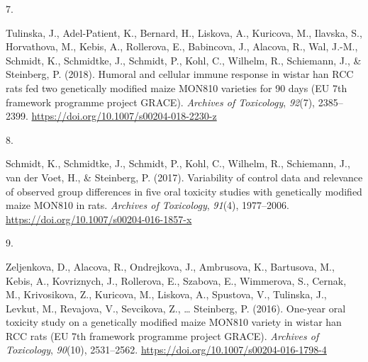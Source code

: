 \documentclass[11pt, a4paper]{awesome-cv}
\newlength{\csllabelwidth}
\newcommand{\CSLLeftMargin}[1]{\parbox[t]{\csllabelwidth}{#1}}
\newcommand{\CSLRightInline}[1]{\parbox[t]{\linewidth - \csllabelwidth}{#1}}
\begin{document}
\leavevmode\hypertarget{ref-Tulinska2018}{}%
\CSLLeftMargin{7. }
\CSLRightInline{Tulinska, J., Adel-Patient, K., Bernard, H., Liskova,
A., Kuricova, M., Ilavska, S., Horvathova, M., Kebis, A., Rollerova, E.,
Babincova, J., Alacova, R., Wal, J.-M., Schmidt, K., Schmidtke, J.,
Schmidt, P., Kohl, C., Wilhelm, R., Schiemann, J., \& Steinberg, P.
(2018). Humoral and cellular immune response in wistar han RCC rats fed
two genetically modified maize MON810 varieties for 90 days (EU 7th
framework programme project GRACE). \emph{Archives of Toxicology},
\emph{92}(7), 2385--2399.
\url{https://doi.org/10.1007/s00204-018-2230-z}}

\leavevmode\hypertarget{ref-Schmidt2017}{}%
\CSLLeftMargin{8. }
\CSLRightInline{Schmidt, K., Schmidtke, J., Schmidt, P., Kohl, C.,
Wilhelm, R., Schiemann, J., van der Voet, H., \& Steinberg, P. (2017).
Variability of control data and relevance of observed group differences
in five oral toxicity studies with genetically modified maize MON810 in
rats. \emph{Archives of Toxicology}, \emph{91}(4), 1977--2006.
\url{https://doi.org/10.1007/s00204-016-1857-x}}

\leavevmode\hypertarget{ref-Zeljenkova2016}{}%
\CSLLeftMargin{9. }
\CSLRightInline{Zeljenkova, D., Alacova, R., Ondrejkova, J., Ambrusova,
K., Bartusova, M., Kebis, A., Kovriznych, J., Rollerova, E., Szabova,
E., Wimmerova, S., Cernak, M., Krivosikova, Z., Kuricova, M., Liskova,
A., Spustova, V., Tulinska, J., Levkut, M., Revajova, V., Sevcikova, Z.,
\ldots{} Steinberg, P. (2016). One-year oral toxicity study on a
genetically modified maize MON810 variety in wistar han RCC rats (EU 7th
framework programme project GRACE). \emph{Archives of Toxicology},
\emph{90}(10), 2531--2562.
\url{https://doi.org/10.1007/s00204-016-1798-4}}
\end{document}
